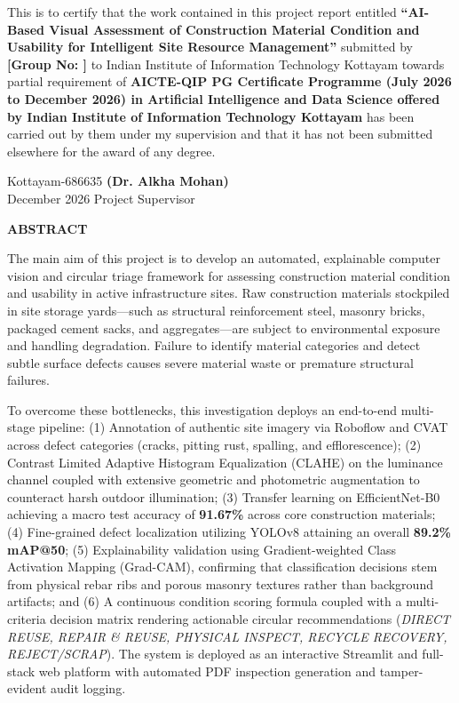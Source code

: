 \documentclass[12pt,a4paper]{report}
\theoremstyle{definition}
\begin{document}
This is to certify that the work contained in this project report entitled \textbf{“AI-Based Visual Assessment of Construction Material Condition and Usability for Intelligent Site Resource Management”} submitted by \textbf{[Group No: ]} to Indian Institute of Information Technology Kottayam towards partial requirement of \textbf{AICTE-QIP PG Certificate Programme (July 2026 to December 2026) in Artificial Intelligence and Data Science offered by Indian Institute of Information Technology Kottayam} has been carried out by them under my supervision and that it has not been submitted elsewhere for the award of any degree.

\vspace{4.0cm}
\noindent Kottayam-686635 \hfill \textbf{(Dr. Alkha Mohan)} \\
December 2026 \hfill Project Supervisor

\newpage

\begin{center}
    {\Large \textbf{ABSTRACT}} \par
\end{center}
\vspace{0.8cm}

The main aim of this project is to develop an automated, explainable computer vision and circular triage framework for assessing construction material condition and usability in active infrastructure sites. Raw construction materials stockpiled in site storage yards—such as structural reinforcement steel, masonry bricks, packaged cement sacks, and aggregates—are subject to environmental exposure and handling degradation. Failure to identify material categories and detect subtle surface defects causes severe material waste or premature structural failures. 

To overcome these bottlenecks, this investigation deploys an end-to-end multi-stage pipeline: (1) Annotation of authentic site imagery via Roboflow and CVAT across defect categories (cracks, pitting rust, spalling, and efflorescence); (2) Contrast Limited Adaptive Histogram Equalization (CLAHE) on the luminance channel coupled with extensive geometric and photometric augmentation to counteract harsh outdoor illumination; (3) Transfer learning on EfficientNet-B0 achieving a macro test accuracy of \textbf{91.67\%} across core construction materials; (4) Fine-grained defect localization utilizing YOLOv8 attaining an overall \textbf{89.2\% mAP@50}; (5) Explainability validation using Gradient-weighted Class Activation Mapping (Grad-CAM), confirming that classification decisions stem from physical rebar ribs and porous masonry textures rather than background artifacts; and (6) A continuous condition scoring formula coupled with a multi-criteria decision matrix rendering actionable circular recommendations (\textit{DIRECT REUSE, REPAIR \& REUSE, PHYSICAL INSPECT, RECYCLE RECOVERY, REJECT/SCRAP}). The system is deployed as an interactive Streamlit and full-stack web platform with automated PDF inspection generation and tamper-evident audit logging.
\end{document}

